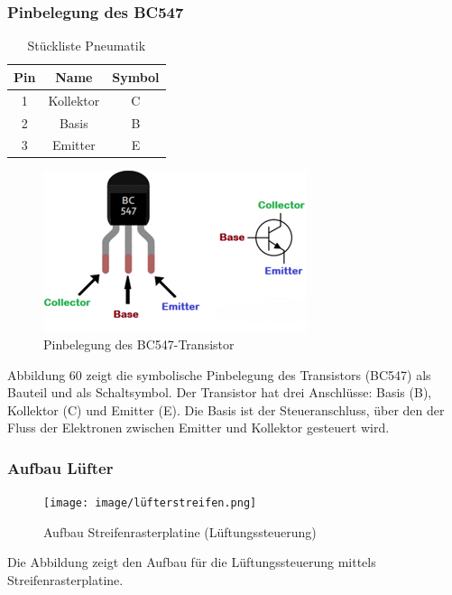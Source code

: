 \subsubsection{Pinbelegung des BC547}
\begin{table}[H]
	\centering
	\begin{tabular}{ | c | c | c | } 
		\hline
		\textbf{Pin} & \textbf{Name} &\textbf{Symbol}\\ 
		\hline
		1 & Kollektor & C\\ 
		\hline
		2 & Basis& B\\ 
		\hline
		3 & Emitter & E \\ 
		\hline
	\end{tabular}
	\caption{Stückliste Pneumatik}
\end{table}
\vspace{2mm}
\begin{figure}[H]
	\centering
	\includegraphics{image/pinbelegung transistor.png}
	\caption{Pinbelegung des BC547-Transistor\autocite{BC547Bild}}
	\label{fig:enter-label}
\end{figure}
Abbildung 60 zeigt die symbolische Pinbelegung des Transistors (BC547) als Bauteil und als Schaltsymbol. Der Transistor hat drei Anschlüsse: Basis (B), Kollektor (C) und Emitter (E). Die Basis ist der Steueranschluss, über den der Fluss der Elektronen zwischen Emitter und Kollektor gesteuert wird.


\subsubsection{Aufbau Lüfter}
\begin{figure}[H]
    \centering
    \texttt{[image: image/lüfterstreifen.png]}
    \caption{Aufbau Streifenrasterplatine (Lüftungssteuerung)}
    \label{fig:enter-label}
\end{figure}
\vspace{3mm}
Die Abbildung zeigt den Aufbau für die Lüftungssteuerung mittels Streifenrasterplatine. 
\newpage
